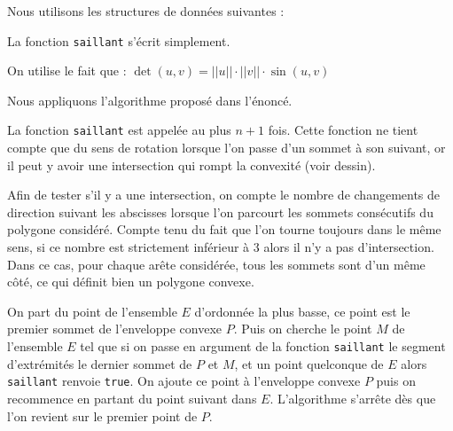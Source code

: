 \Corrige

\Q
Nous utilisons les structures de données suivantes :



La fonction \texttt{saillant} s'écrit simplement.
\medskip

On utilise le fait que : $\det(u,v)=||u||\cdot||v||\cdot\sin(u,v)$



\Q
Nous appliquons l'algorithme proposé dans l'énoncé.



La fonction \texttt{saillant} est appelée au plus $n+1$ fois. Cette fonction ne tient compte que du sens de rotation lorsque l'on passe d'un sommet à son suivant, or il peut y avoir une intersection qui rompt la convexité (voir dessin).

\begin{center}
\end{center}

\Q
Afin de tester s'il y a une intersection, on compte le nombre de changements de direction suivant les abscisses lorsque l'on parcourt les sommets consécutifs du polygone considéré. Compte tenu du fait que l'on tourne toujours dans le même sens, si ce nombre est strictement inférieur à 3 alors il n'y a pas d'intersection. Dans ce cas, pour chaque arête considérée, tous les sommets sont d'un même côté, ce qui définit bien un polygone convexe.



\Q
On part du point de l'ensemble $E$ d'ordonnée la plus basse, ce point est le premier sommet de l'enveloppe convexe $P$. Puis on cherche le point $M$ de l'ensemble $E$ tel que si on passe en argument de la fonction \texttt{saillant} le segment d'extrémités le dernier sommet de $P$ et $M$, et un point quelconque de $E$ alors \texttt{saillant} renvoie \texttt{true}. On ajoute ce point à l'enveloppe convexe $P$ puis on recommence en partant du point suivant dans $E$. L'algorithme s'arrête dès que l'on revient sur le premier point de $P$.

